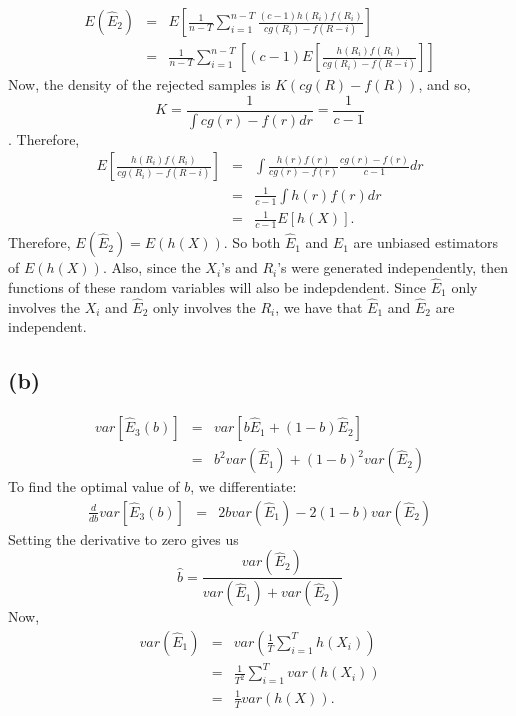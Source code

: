 \documentclass{article}\usepackage[]{graphicx}\usepackage[]{color}
\begin{document}
\begin{eqnarray*}
  E(\hat{E}_2) &=& E\left[ \frac{1}{n-T}\sum_{i=1}^{n-T} \frac{(c-1)h(R_i)f(R_i)}{cg(R_i)-f(R-i)} \right] \\
  &=& \frac{1}{n-T}\sum_{i=1}^{n-T} \left[ (c-1)E\left[\frac{h(R_i)f(R_i)}{cg(R_i)-f(R-i)}\right] \right]
\end{eqnarray*}
Now, the density of the rejected samples is $K(cg(R)-f(R))$, and so, $$ K=\frac{1}{\int cg(r)-f(r)dr} = \frac{1}{c-1} $$.
Therefore, 
\begin{eqnarray*}
  E\left[\frac{h(R_i)f(R_i)}{cg(R_i)-f(R-i)}\right] &=& \int\frac{h(r)f(r)}{cg(r)-f(r)}\frac{cg(r)-f(r)}{c-1} dr \\
  &=& \frac{1}{c-1}\int h(r)f(r)dr \\
  &=& \frac{1}{c-1}E\left[ h(X)\right].
\end{eqnarray*}
Therefore, $E(\hat{E}_2) = E(h(X))$.  So both $\hat{E}_1$ and $\hat{E}_1$ are unbiased estimators of $E(h(X))$.  Also, since the $X_i$'s and $R_i$'s were generated independently, then functions of these random variables will also be indepdendent.  Since $\hat{E}_1$ only involves the $X_i$ and $\hat{E}_2$ only involves the $R_i$, we have that $\hat{E}_1$ and $\hat{E}_2$ are independent. 

\subsection*{(b)}
\begin{eqnarray*}
  var\left[\hat{E}_3(b)\right] &=& var\left[ b\hat{E}_1 + (1-b)\hat{E}_2\right] \\
    &=& b^2 var(\hat{E}_1) + (1-b)^2 var(\hat{E}_2)
\end{eqnarray*}
To find the optimal value of $b$, we differentiate:
\begin{eqnarray*}
  \frac{d}{db}var\left[\hat{E}_3(b)\right] &=& 2b var(\hat{E}_1) - 2(1-b) var(\hat{E}_2)
\end{eqnarray*}
Setting the derivative to zero gives us $$\hat{b}=\frac{var(\hat{E}_2)}{var(\hat{E}_1) + var(\hat{E}_2)}$$
Now, 
\begin{eqnarray*}
  var(\hat{E}_1) &=& var\left(\frac{1}{T}\sum_{i=1}^T h(X_i)\right) \\
  &=& \frac{1}{T^2} \sum_{i=1}^T var(h(X_i)) \\
  &=& \frac{1}{T} var(h(X)).
\end{eqnarray*}
\end{document}
